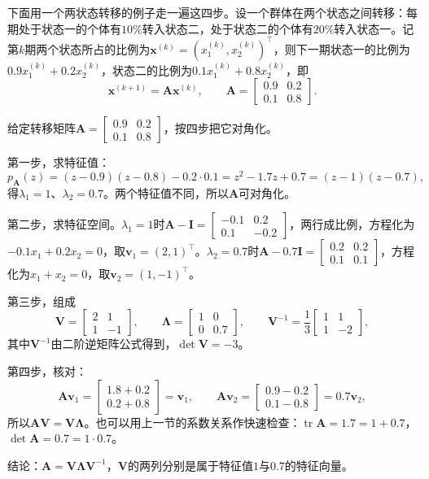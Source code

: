 下面用一个两状态转移的例子走一遍这四步。设一个群体在两个状态之间转移：每期处于状态一的个体有$10\%$转入状态二，处于状态二的个体有$20\%$转入状态一。记第$k$期两个状态所占的比例为$\bm x^{(k)}=(x_1^{(k)},x_2^{(k)})^{\top}$，则下一期状态一的比例为$0.9x_1^{(k)}+0.2x_2^{(k)}$，状态二的比例为$0.1x_1^{(k)}+0.8x_2^{(k)}$，即
\[
 \bm x^{(k+1)}=\bm A\bm x^{(k)},\qquad
 \bm A=\begin{bmatrix}0.9&0.2\\0.1&0.8\end{bmatrix}.
\]
\begin{example}[两状态转移矩阵的对角化]
\label{ex:ls-transition-matrix-diagonalization}
给定转移矩阵$\bm A=\left[\begin{smallmatrix}0.9&0.2\\0.1&0.8\end{smallmatrix}\right]$，按四步把它对角化。

第一步，求特征值：
\[
 p_{\bm A}(z)=(z-0.9)(z-0.8)-0.2\cdot0.1=z^2-1.7z+0.7=(z-1)(z-0.7),
\]
得$\lambda_1=1$、$\lambda_2=0.7$。两个特征值不同，所以$\bm A$可对角化。

第二步，求特征空间。$\lambda_1=1$时$\bm A-\bm I=\left[\begin{smallmatrix}-0.1&0.2\\0.1&-0.2\end{smallmatrix}\right]$，两行成比例，方程化为$-0.1x_1+0.2x_2=0$，取$\bm v_1=(2,1)^{\top}$。$\lambda_2=0.7$时$\bm A-0.7\bm I=\left[\begin{smallmatrix}0.2&0.2\\0.1&0.1\end{smallmatrix}\right]$，方程化为$x_1+x_2=0$，取$\bm v_2=(1,-1)^{\top}$。

第三步，组成
\[
 \bm V=\begin{bmatrix}2&1\\1&-1\end{bmatrix},\qquad
 \bm\Lambda=\begin{bmatrix}1&0\\0&0.7\end{bmatrix},\qquad
 \bm V^{-1}=\frac13\begin{bmatrix}1&1\\1&-2\end{bmatrix},
\]
其中$\bm V^{-1}$由二阶逆矩阵公式得到，$\det\bm V=-3$。

第四步，核对：
\[
 \bm A\bm v_1=\begin{bmatrix}1.8+0.2\\0.2+0.8\end{bmatrix}=\bm v_1,\qquad
 \bm A\bm v_2=\begin{bmatrix}0.9-0.2\\0.1-0.8\end{bmatrix}=0.7\bm v_2,
\]
所以$\bm A\bm V=\bm V\bm\Lambda$。也可以用上一节的系数关系作快速检查：$\operatorname{tr}\bm A=1.7=1+0.7$，$\det\bm A=0.7=1\cdot0.7$。

结论：$\bm A=\bm V\bm\Lambda\bm V^{-1}$，$\bm V$的两列分别是属于特征值$1$与$0.7$的特征向量。
\end{example}

